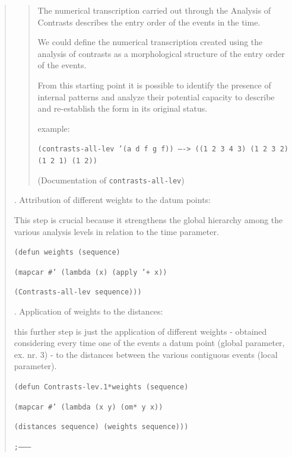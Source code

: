 \begin{quotation}
\begin{quotation}
\begin{slshape}
\noindent The numerical transcription carried out through the Analysis of Contrasts describes the entry order of the events in the time.

\noindent We could define the numerical transcription created using the analysis of contrasts as a morphological structure of the entry order of the events.

\noindent From this starting point it is possible to identify the presence of internal patterns and analyze their potential capacity to describe and re-establish the form in its original status.

\noindent example:
\end{slshape}

\noindent\texttt{\footnotesize (contrasts-all-lev '(a d f g f)) ----> ((1 2 3 4 3) (1 2 3 2) (1 2 1) (1 2))}

\noindent (Documentation of \texttt{contrasts-all-lev})
\end{quotation} 
\begin{slshape} 
. Attribution of different weights to the datum points:

\noindent This step is crucial because it strengthens the global hierarchy among the various analysis levels in relation to the time parameter.
\end{slshape} 

\noindent\texttt{\footnotesize (defun weights (sequence)}

\noindent\texttt{\footnotesize \quad   (mapcar \#' (lambda (x) (apply '+ x))}

\noindent\texttt{\footnotesize \quad \quad  (Contrasts-all-lev sequence)))}

\begin{slshape} 
. Application of weights to the distances:

\noindent this further step is just the application of different weights - obtained considering every time one of the events a datum point (global parameter, ex. nr. 3) - to the distances between the various contiguous events (local parameter).
\end{slshape} 

\noindent\texttt{\footnotesize (defun Contrasts-lev.1*weights (sequence)}

\noindent\texttt{\footnotesize \quad    (mapcar \#' (lambda (x y) (om* y x))}

\noindent\texttt{\footnotesize \quad  \quad (distances sequence) (weights sequence)))}

\noindent\texttt{\footnotesize ;--------}


\end{quotation}
